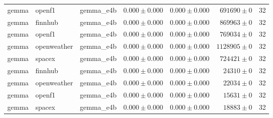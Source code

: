 \begin{table}[htbp]
\begin{tabular}{l l l r r r r}
gemma & openf1 & gemma\_e4b & $0.000\pm0.000$ & $0.000\pm0.000$ & $691690\pm0$ & 32 \\
gemma & finnhub & gemma\_e4b & $0.000\pm0.000$ & $0.000\pm0.000$ & $869963\pm0$ & 32 \\
gemma & openf1 & gemma\_e4b & $0.000\pm0.000$ & $0.000\pm0.000$ & $769034\pm0$ & 32 \\
gemma & openweather & gemma\_e4b & $0.000\pm0.000$ & $0.000\pm0.000$ & $1128905\pm0$ & 32 \\
gemma & spacex & gemma\_e4b & $0.000\pm0.000$ & $0.000\pm0.000$ & $724421\pm0$ & 32 \\
gemma & finnhub & gemma\_e4b & $0.000\pm0.000$ & $0.000\pm0.000$ & $24310\pm0$ & 32 \\
gemma & openweather & gemma\_e4b & $0.000\pm0.000$ & $0.000\pm0.000$ & $22034\pm0$ & 32 \\
gemma & openf1 & gemma\_e4b & $0.000\pm0.000$ & $0.000\pm0.000$ & $15631\pm0$ & 32 \\
gemma & spacex & gemma\_e4b & $0.000\pm0.000$ & $0.000\pm0.000$ & $18883\pm0$ & 32 \\
\hline
\end{tabular}
\end{table}
